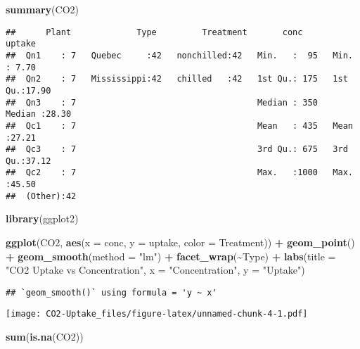 \documentclass[
]{article}
\newenvironment{Shaded}{\begin{snugshade}}{\end{snugshade}}
\newcommand{\AttributeTok}[1]{\textcolor[rgb]{0.13,0.29,0.53}{#1}}
\newcommand{\FunctionTok}[1]{\textcolor[rgb]{0.13,0.29,0.53}{\textbf{#1}}}
\newcommand{\NormalTok}[1]{#1}
\newcommand{\SpecialCharTok}[1]{\textcolor[rgb]{0.81,0.36,0.00}{\textbf{#1}}}
\newcommand{\StringTok}[1]{\textcolor[rgb]{0.31,0.60,0.02}{#1}}
\begin{document}
\begin{Shaded}
\begin{Highlighting}[]
\FunctionTok{summary}\NormalTok{(CO2)}
\end{Highlighting}
\end{Shaded}

\begin{verbatim}
##      Plant             Type         Treatment       conc          uptake     
##  Qn1    : 7   Quebec     :42   nonchilled:42   Min.   :  95   Min.   : 7.70  
##  Qn2    : 7   Mississippi:42   chilled   :42   1st Qu.: 175   1st Qu.:17.90  
##  Qn3    : 7                                    Median : 350   Median :28.30  
##  Qc1    : 7                                    Mean   : 435   Mean   :27.21  
##  Qc3    : 7                                    3rd Qu.: 675   3rd Qu.:37.12  
##  Qc2    : 7                                    Max.   :1000   Max.   :45.50  
##  (Other):42
\end{verbatim}

\begin{Shaded}
\begin{Highlighting}[]
\FunctionTok{library}\NormalTok{(ggplot2)}

\FunctionTok{ggplot}\NormalTok{(CO2, }\FunctionTok{aes}\NormalTok{(}\AttributeTok{x =}\NormalTok{ conc, }\AttributeTok{y =}\NormalTok{ uptake, }\AttributeTok{color =}\NormalTok{ Treatment)) }\SpecialCharTok{+}
  \FunctionTok{geom\_point}\NormalTok{() }\SpecialCharTok{+}
  \FunctionTok{geom\_smooth}\NormalTok{(}\AttributeTok{method =} \StringTok{"lm"}\NormalTok{) }\SpecialCharTok{+}
  \FunctionTok{facet\_wrap}\NormalTok{(}\SpecialCharTok{\textasciitilde{}}\NormalTok{Type) }\SpecialCharTok{+}
  \FunctionTok{labs}\NormalTok{(}\AttributeTok{title =} \StringTok{"CO2 Uptake vs Concentration"}\NormalTok{, }\AttributeTok{x =} \StringTok{"Concentration"}\NormalTok{, }\AttributeTok{y =} \StringTok{"Uptake"}\NormalTok{)}
\end{Highlighting}
\end{Shaded}

\begin{verbatim}
## `geom_smooth()` using formula = 'y ~ x'
\end{verbatim}

\texttt{[image: CO2-Uptake\_files/figure-latex/unnamed-chunk-4-1.pdf]}

\begin{Shaded}
\begin{Highlighting}[]
\FunctionTok{sum}\NormalTok{(}\FunctionTok{is.na}\NormalTok{(CO2))}
\end{Highlighting}
\end{Shaded}
\end{document}
